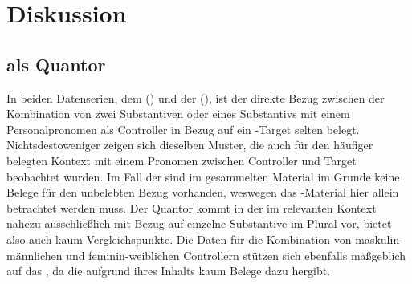 \chapter{Diskussion}
\label{ch:diskussion}


\section{ als Quantor}


In beiden Datenserien, dem  (\CAO{}) und der
\KC{} (\KC{}), ist der direkte Bezug zwischen der Kombination von
zwei Substantiven oder eines Substantivs mit einem Personalpronomen als
Controller in Bezug auf ein -Target selten belegt.
Nichtsdestoweniger zeigen sich dieselben Muster, die auch für den häufiger
belegten Kontext mit einem Pronomen zwischen Controller und Target beobachtet
wurden. Im Fall der \KC{} sind im gesammelten Material im Grunde keine
Belege für den unbelebten Bezug vorhanden, weswegen das
\CAO{}-Material hier allein betrachtet werden muss. Der Quantor
  \autocite[vgl.][606--621]{ksw2} kommt in der \KC{}
im relevanten Kontext nahezu ausschließlich mit Bezug auf einzelne
Substan\-tive im Plural vor, bietet also auch kaum Vergleichspunkte. Die Daten
für die Kombination von maskulin-männlichen und feminin-weiblichen Controllern
stützen sich ebenfalls maßgeblich auf das \CAO{}, da die \KC{}
aufgrund ihres Inhalts kaum Belege dazu hergibt.


